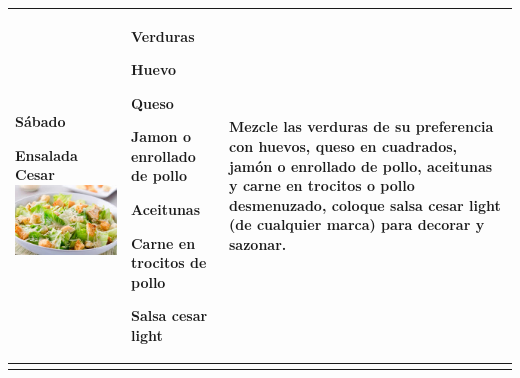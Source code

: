 \documentclass[menu.tex]{subfiles}
\begin{document}
\begin{tabular} {p{3.5cm} p{4cm} p{9cm}}
\pbox{20cm}
{
\rule{0pt}{3ex}\begin{large}\textbf{Sábado}\end{large}\\
\rule{0pt}{2ex}Ensalada Cesar\\
\includegraphics[scale=0.40]{ensalada-cesar}
}& 
\vspace{-1.6cm}
\begin{compactitem} 
\begin{footnotesize}
\item Verduras
\item Huevo
\item Queso
\item Jamon o enrollado de pollo
\item Aceitunas
\item Carne en trocitos de pollo
\item Salsa cesar light
\end{footnotesize}
\end{compactitem}&
\vspace{-1.6cm}
Mezcle las verduras de su preferencia con huevos, queso en cuadrados, jamón o enrollado de pollo, aceitunas y carne en trocitos o pollo desmenuzado, coloque salsa cesar light (de cualquier marca) para decorar y sazonar. \\ \hline
\newpage
\end{tabular}
\end{document}

